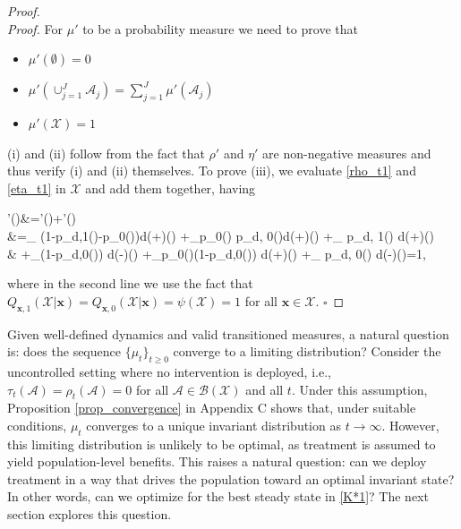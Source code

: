 \documentclass[12pt,a4paper]{article}
\newcommand{\bx}{\mathbf{x}}
\begin{document}
		\begin{proof}\\
			{\it Proof.} 
			For $\mu'$ to be a probability measure we need to prove that
			\begin{itemize}
				\item[(i)] $\mu'(\emptyset)=0$
				\item[(ii)] $\mu'(\cup_{j=1}^J \mathcal{A}_j )=\sum_{j=1}^J\mu'( \mathcal{A}_j )$
				\item[(iii)] $\mu'(\mathcal{X})=1$
			\end{itemize}
			
			(i) and (ii) follow from the fact that $\rho'$ and $\eta'$ are non-negative measures and thus verify (i) and (ii) themselves. To prove (iii), we evaluate \eqref{rho_t1} and \eqref{eta_t1} in $\mathcal{X}$ and add them together, having
			
		\begin{flalign*}
				\mu'(\mathcal{X})&=\rho'()+\eta'()\\
				&=\int_ (1-p_{d,1}(\bx)-p_{0}(\bx))d(\rho+\tau)(\bx)
				+\int_{}p_{0}(\bx) p_{d, 0}(\bx)d(\rho+\tau)(\bx)
				+\int_{} p_{d, 1}() d(\rho+\tau)()\\
			& +\int_{}(1-p_{d,0}(\bx)) d(\eta-\tau)(\bx)
			+\int_{}p_{0}(\bx)(1-p_{d,0}(\bx)) d(\rho+\tau)(\bx)
			 +\int_{} p_{d, 0}() d(\eta-\tau)()=1,
			\end{flalign*}
			
			\noindent where in the second line we use the fact that $Q_{\bx,1}(\mathcal{X}|\bx)=Q_{\bx,0}(\mathcal{X}|\bx)=\psi(\mathcal{X})=1$ for all $\bx \in \mathcal{X}$. \hfill $\square$
			
		\end{proof}




Given well-defined dynamics and valid transitioned measures, a natural question is: does the sequence $\{\mu_t\}_{t \geq 0}$ converge to a limiting distribution? Consider the uncontrolled setting where no intervention is deployed, i.e., $\tau_t(\mathcal{A}) = \rho_t(\mathcal{A}) = 0$ for all $\mathcal{A} \in \mathcal{B}(\mathcal{X})$ and all $t$. Under this assumption, Proposition \ref{prop_convergence} in Appendix C shows that, under suitable conditions, $\mu_t$ converges to a unique invariant distribution as $t \to \infty$. However, this limiting distribution is unlikely to be optimal, as treatment is assumed to yield population-level benefits. This raises a natural question: can we deploy treatment in a way that drives the population toward an optimal invariant state? In other words, can we optimize for the best steady state in \eqref{K*1}? The next section explores this question.
\end{document}
